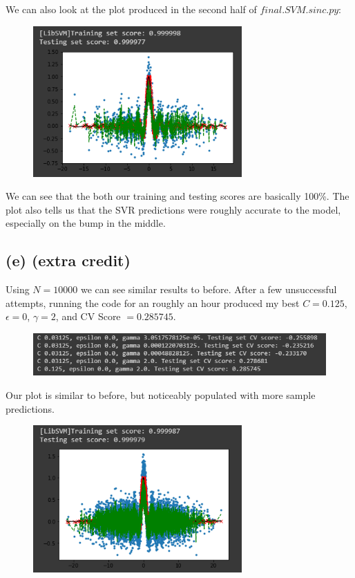 \documentclass[a4paper]{article}
\begin{document}
We can also look at the plot produced in the second half of $final.SVM.sinc.py$:


\begin{figure}[h]
  \begin{center}
    \includegraphics[width=80mm,scale=0.8]{problem1d.png}
  \end{center}
\end{figure}


We can see that the both our training and testing scores are basically 100\%. The plot also tells us that the SVR predictions were roughly accurate to the model, especially on the bump in the middle.


\subsection{(e) (extra credit)}

Using $N=10000$ we can see similar results to before. After a few unsuccessful attempts, running the code for an roughly an hour produced my best $C=0.125$, $\epsilon=0$, $\gamma=2$, and CV Score $= 0.285745$.

\begin{figure}[h]
  \begin{center}
    \includegraphics[width=150mm,scale=1]{problem1e.png}
  \end{center}
\end{figure}


Our plot is similar to before, but noticeably populated with more sample predictions.


\begin{figure}[h]
  \begin{center}
    \includegraphics[width=80mm,scale=1]{problem1e2.png}
  \end{center}
\end{figure}
\end{document}
